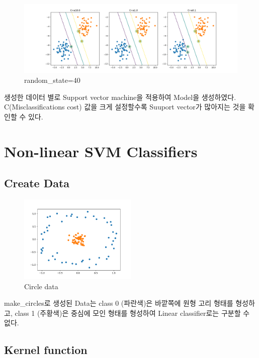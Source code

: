 \documentclass[]{report}
\begin{document}
\begin{figure}[ht!]
    \centering
    \includegraphics[width=1\textwidth]{image/1-3.png}
    \caption{random\_state=40}
    \label{1-3}
\end{figure}

생성한 데이터 별로 Support vector machine을 적용하여 Model을 생성하였다. 
C(Misclassifications cost) 값을 크게 설정할수록 Suuport vector가 많아지는 것을 확인할 수 있다.  \\


\section{Non-linear SVM Classifiers}

\subsection{Create Data}

\begin{figure}[ht!]
    \centering
    \includegraphics[width=0.5\textwidth]{image/2-1.png}
    \caption{Circle data}
    \label{2-1}
\end{figure}

make\_circles로 생성된 Data는 class 0 (파란색)은 바깥쪽에 원형 고리 형태를 형성하고,
class 1 (주황색)은 중심에 모인 형태를 형성하여 Linear classifier로는 구분할 수 없다.  \\


\subsection{Kernel function}
\end{document}
